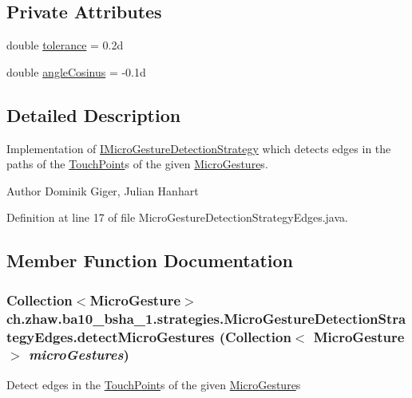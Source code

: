 \subsection*{Private Attributes}
\begin{DoxyCompactItemize}
\item 
double \hyperlink{classch_1_1zhaw_1_1ba10__bsha__1_1_1strategies_1_1MicroGestureDetectionStrategyEdges_a17536b25d63e07e0c5c776e017a4b29c}{tolerance} = 0.2d
\item 
double \hyperlink{classch_1_1zhaw_1_1ba10__bsha__1_1_1strategies_1_1MicroGestureDetectionStrategyEdges_a2490c2e49516999b5b3f9da8a9a6b8ba}{angleCosinus} = -\/0.1d
\end{DoxyCompactItemize}


\subsection{Detailed Description}
Implementation of \hyperlink{interfacech_1_1zhaw_1_1ba10__bsha__1_1_1strategies_1_1IMicroGestureDetectionStrategy}{IMicroGestureDetectionStrategy} which detects edges in the paths of the \hyperlink{classch_1_1zhaw_1_1ba10__bsha__1_1_1TouchPoint}{TouchPoint}s of the given \hyperlink{}{MicroGesture}s.

\begin{DoxyAuthor}{Author}
Dominik Giger, Julian Hanhart 
\end{DoxyAuthor}


Definition at line 17 of file MicroGestureDetectionStrategyEdges.java.

\subsection{Member Function Documentation}
\hypertarget{classch_1_1zhaw_1_1ba10__bsha__1_1_1strategies_1_1MicroGestureDetectionStrategyEdges_a16cd0b9ef604ba14a7eb573a77966c4f}{
\subsubsection[{detectMicroGestures}]{\setlength{\rightskip}{0pt plus 5cm}Collection$<${\bf MicroGesture}$>$ ch.zhaw.ba10\_\-bsha\_\-1.strategies.MicroGestureDetectionStrategyEdges.detectMicroGestures (Collection$<$ {\bf MicroGesture} $>$ {\em microGestures})}}
\label{classch_1_1zhaw_1_1ba10__bsha__1_1_1strategies_1_1MicroGestureDetectionStrategyEdges_a16cd0b9ef604ba14a7eb573a77966c4f}
Detect edges in the \hyperlink{classch_1_1zhaw_1_1ba10__bsha__1_1_1TouchPoint}{TouchPoint}s of the given \hyperlink{}{MicroGesture}s


